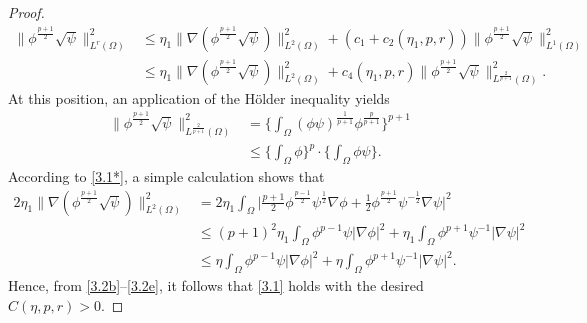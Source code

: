 \documentclass[12pt]{article}
\theoremstyle{plain}
\theoremstyle{definition}
\numberwithin{equation}{section}
\begin{document}
\begin{proof}
    \begin{align}\label{3.2c}
      \|\phi^{\frac{p+1}{2}}\sqrt{\psi}\|^2_{L^{r}(\Omega)}
      &\leq \eta_1 \|\nabla
      (\phi^{\frac{p+1}{2}}\sqrt{\psi})\|_{L^{2}(\Omega)}^2+(c_1+c_2(\eta_1,p,r))\|\phi^{\frac{p+1}{2}}\sqrt{\psi}\|_{L^{1}(\Omega)}^2
     \nonumber \\
      &\leq \eta_1 \|\nabla
      (\phi^{\frac{p+1}{2}}\sqrt{\psi})\|_{L^{2}(\Omega)}^2+c_4(\eta_1,p,r)\|\phi^{\frac{p+1}{2}}\sqrt{\psi}\|_{L^{\frac2{p+1}}(\Omega)}^2.
    \end{align}
    At this position,  an application  of the H\"{o}lder inequality yields
    \begin{equation}\label{3.2d}
    \begin{split}
    \|\phi^{\frac{p+1}{2}}\sqrt{\psi}\|_{L^{\frac2{p+1}}(\Omega)}^2&=\bigg\{\int_\Omega(\phi\psi)^{\frac1{p+1}}\phi^{\frac{p}{p+1}}\bigg\}^{p+1}\\
    &\leq\bigg\{\int_\Omega\phi\bigg\}^{p}\cdot\bigg\{\int_\Omega \phi\psi\bigg\}.
    \end{split}
    \end{equation}
    According to \eqref{3.1*}, a simple calculation shows that
    \begin{align}\label{3.2e}
    2\eta_1\|\nabla
    (\phi^{\frac{p+1}{2}}\sqrt{\psi})\|_{L^{2}(\Omega)}^2
    &=2\eta_1\int_\Omega\bigg|\frac{p+1}{2}\phi^{\frac{p-1}{2}}\psi^{\frac1 2}\nabla\phi+\frac1 2 \phi^{\frac{p+1}{2}}\psi^{-\frac1 2}\nabla\psi\bigg|^2\nonumber\\
    &\leq (p+1)^2\eta_1\int_\Omega\phi^{p-1}\psi|\nabla\phi|^2
    +\eta_1 \int_\Omega\phi^{p+1}\psi^{-1}|\nabla\psi|^2\nonumber\\
    &\leq\eta\int_\Omega\phi^{p-1}\psi|\nabla\phi|^2
    +\eta\int_\Omega\phi^{p+1}\psi^{-1}|\nabla\psi|^2.
    \end{align}
    Hence,  from \eqref{3.2b}--\eqref{3.2e}, it follows that \eqref{3.1} holds with the desired $C(\eta,p,r)>0$. %

\end{proof}
\end{document}
